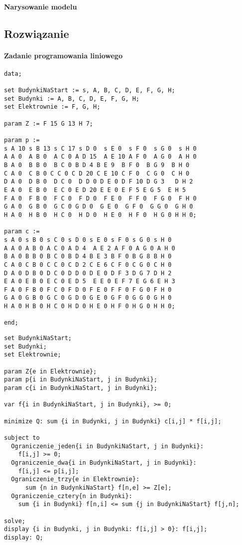 \documentclass[12pt]{article}
\begin{document}
\paragraph{Narysowanie modelu}


\subsection{Rozwiązanie}
\paragraph{Zadanie programowania liniowego}

\begin{lstlisting}[caption= plik dat]
data; 
 
set BudynkiNaStart := s, A, B, C, D, E, F, G, H; 
set Budynki := A, B, C, D, E, F, G, H; 
set Elektrownie := F, G, H; 

param Z := F 15 G 13 H 7; 
 
param p := 
s A 10 s B 13 s C 17 s D 0  s E 0  s F 0  s G 0  s H 0
A A 0  A B 0  A C 0 A D 15  A E 10 A F 0  A G 0  A H 0
B A 0  B B 0  B C 0 B D 4 B E 9  B F 0  B G 9  B H 0
C A 0  C B 0 C C 0 C D 20 C E 10 C F 0  C G 0  C H 0   
D A 0  D B 0  D C 0  D D 0 D E 0 D F 10 D G 3   D H 2 
E A 0  E B 0  E C 0 E D 20 E E 0 E F 5 E G 5  E H 5  
F A 0  F B 0  F C 0  F D 0  F E 0  F F 0  F G 0  F H 0
G A 0  G B 0  G C 0 G D 0  G E 0  G F 0  G G 0  G H 0
H A 0  H B 0  H C 0  H D 0  H E 0  H F 0  H G 0 H H 0; 
 
param c := 
s A 0 s B 0 s C 0 s D 0 s E 0 s F 0 s G 0 s H 0
A A 0 A B 0 A C 0 A D 4  A E 2 A F 0 A G 0 A H 0
B A 0 B B 0 B C 0 B D 4 B E 3 B F 0 B G 8 B H 0
C A 0 C B 0 C C 0 C D 2 C E 6 C F 0 C G 0 C H 0   
D A 0 D B 0 D C 0 D D 0 D E 0 D F 3 D G 7 D H 2
E A 0 E B 0 E C 0 E D 5  E E 0 E F 7 E G 6 E H 3 
F A 0 F B 0 F C 0 F D 0 F E 0 F F 0 F G 0 F H 0
G A 0 G B 0 G C 0 G D 0 G E 0 G F 0 G G 0 G H 0
H A 0 H B 0 H C 0 H D 0 H E 0 H F 0 H G 0 H H 0; 

end; 
\end{lstlisting}
\begin{lstlisting}[caption= plik mod]
set BudynkiNaStart; 
set Budynki; 
set Elektrownie; 

param Z{e in Elektrownie}; 
param p{i in BudynkiNaStart, j in Budynki}; 
param c{i in BudynkiNaStart, j in Budynki}; 

var f{i in BudynkiNaStart, j in Budynki}, >= 0; 
 
minimize Q: sum {i in Budynki, j in Budynki} c[i,j] * f[i,j]; 
 
subject to 
  Ograniczenie_jeden{i in BudynkiNaStart, j in Budynki}: 
    f[i,j] >= 0; 
  Ograniczenie_dwa{i in BudynkiNaStart, j in Budynki}: 
    f[i,j] <= p[i,j]; 
  Ograniczenie_trzy{e in Elektrownie}: 
      sum {n in BudynkiNaStart} f[n,e] >= Z[e]; 
  Ograniczenie_cztery{n in Budynki}: 
    sum {i in Budynki} f[n,i] <= sum {j in BudynkiNaStart} f[j,n]; 
 
solve; 
display {i in Budynki, j in Budynki: f[i,j] > 0}: f[i,j]; 
display: Q;
\end{lstlisting}
\end{document}
